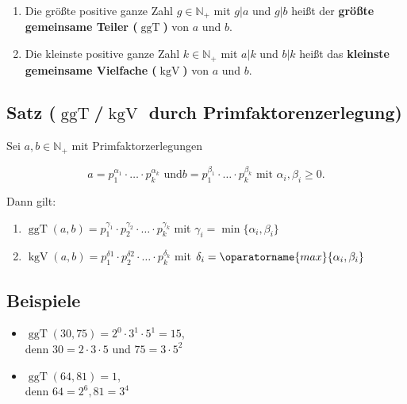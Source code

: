 	\begin{enumerate}
	
		\item Die größte positive ganze Zahl $g\in\mathbb{N_+}$ mit $g|a$ und $g|b$
		heißt der \textbf{größte gemeinsame Teiler ($\operatorname{ggT}$)} von $a$ und $b$.
		
		\item Die kleinste positive ganze Zahl $k\in\mathbb{N_+}$ mit $a|k$ und $b|k$
		heißt das \textbf{kleinste gemeinsame Vielfache ($\operatorname{kgV}$)}
		von $a$ und $b$.
		
	\end{enumerate}


\subsection[$\operatorname{ggT}$/$\operatorname{kgV}$ durch Primfaktorenzerlegung]{Satz ($\operatorname{ggT}$/$\operatorname{kgV}$ durch Primfaktorenzerlegung)}

	Sei $a,b\in\mathbb{N_+}$ mit Primfaktorzerlegungen 

	\[
		a=p_1^{\alpha_1}\cdot\ldots\cdot p_k^{\alpha_k}\text{ und}
		b=p_1^{\beta_1}\cdot\ldots\cdot p_k^{\beta_k}\text{ mit }\alpha_i,\beta_i\geq 0.
	\]
	
	Dann gilt:
	
	\begin{enumerate}
		
		\item $\operatorname{ggT}(a,b)=p_1^{\gamma_1}\cdot p_2^{\gamma_2}
		\cdot\ldots\cdot p_k^{\gamma_k}$ mit $\gamma_i=\operatorname{min}
		\{\alpha_i,\beta_i\}$
		
		\item $\operatorname{kgV}(a,b)=p_1^{\delta1}\cdot p_2^{\delta2}
		\cdot\ldots\cdot p_k^{\delta_k}$ mit $\delta_i=\oparatorname{max}
		\{\alpha_i,\beta_i\}$
		
	\end{enumerate}
	
		
\subsection{Beispiele}

	\begin{itemize}
			
	\item $\operatorname{ggT}(30,75)=2^0\cdot 3^1\cdot 5^1 = 15$,\\ 
	denn $30=2\cdot 3\cdot 5$ und $75=3\cdot 5^2$
	
	\item $\operatorname{ggT}(64,81)=1$,\\ denn $64=2^6,81=3^4$

	\end{itemize}	

